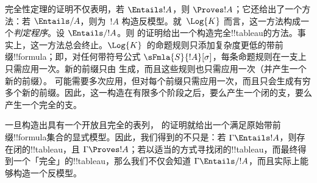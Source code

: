 \documentclass[../../../include/open-logic-section]{subfiles}
\begin{document}


\begin{explain}
  完全性定理的证明不仅表明，若 $\Entails !A$，则 $\Proves !A$；它还给出了一个方法：若 $\Entails/ A$，则为~$!A$ 构造反模型。就~$\Log{K}$ 而言，这一方法构成一个\emph{判定程序}。设 $\Entails/ !A$。则  的证明给出一个构造完全!!{tableau}的方法。事实上，这一方法总会终止。$\Log{K}$~的命题规则只添加复杂度更低的带前缀!!{formula}；即，对任何带符号公式 $\sFmla{S}{!A}[\sigma]$，每条命题规则在一支上只需应用一次。新的前缀只由
  生成，而且这些规则也只需应用一次（并产生一个新的前缀）。
  可能需要多次应用，但对每个前缀只需应用一次，而且只会生成有穷多个新的前缀。因此，这一构造在有限多个阶段之后，要么产生一个闭的支，要么产生一个完全的支。

  一旦构造出具有一个开放且完全的表列， 的证明就给出一个满足原始带前缀!!{formula}集合的显式模型。因此，我们得到的不只是：若 $\Gamma \Entails !A$，则存在闭的!!{tableau}，且 $\Gamma \Proves !A$；若以适当的方式寻找闭的!!{tableau}，而最终得到一个「完全」的!!{tableau}，那么我们不仅会知道 $\Gamma \Entails/ !A$，而且实际上能够构造一个反模型。
\end{explain}
\end{document}
